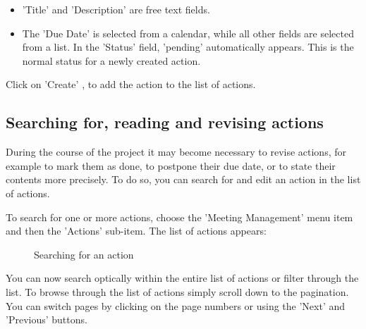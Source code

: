 \begin{itemize}
\item
'Title'  and 'Description'  are free text fields.
\item
The 'Due Date'  is selected from a calendar, while all other fields  are selected from a list. In the 'Status' field, 'pending' automatically appears. This is the normal status for a newly created action.
\end{itemize}
Click on 'Create' , to add the action to the list of actions.

\subsection{Searching for, reading and revising actions}
During the course of the project it may become necessary to revise actions, for example to  mark them as done, to postpone their due date, or to state their contents more precisely. To do so, you can search for and edit an action in the list of actions.

\vspace{\baselineskip}

To search for one or more actions, choose the 'Meeting Management' menu item and then the 'Actions' sub-item. The list of actions appears:

\begin{figure}[H]
\caption{Searching for an action}
\end{figure}

You can now search optically within the entire list of actions or filter through the list. To browse through the list of actions simply scroll down to the pagination. You can switch pages by clicking on the page numbers or using the 'Next' and 'Previous' buttons.

\begin{figure}[H]
\end{figure}

